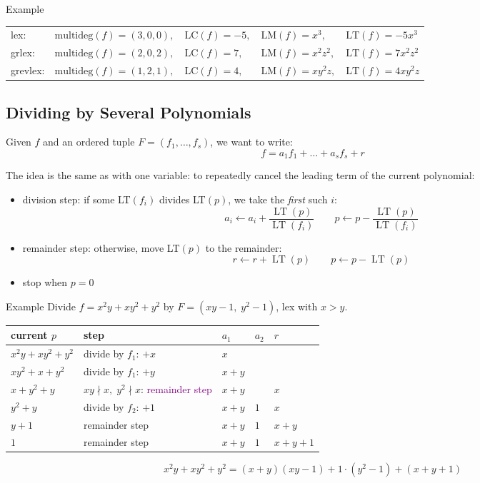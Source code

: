 \documentclass[a4paper, 11pt]{report}
\newcommand{\LT}{\operatorname{LT}}
\begin{document}
\begin{gframe}{Example}
\noindent
\begin{tabular}{@{}l@{\quad}l@{\quad}l@{\quad}l@{\quad}l@{}}
lex:     & $\mathrm{multideg}(f) = (3, 0, 0),$ & $\mathrm{LC}(f) = -5,$ & $\mathrm{LM}(f) = x^3,$    & $\mathrm{LT}(f) = -5x^3$ \\
grlex:   & $\mathrm{multideg}(f) = (2, 0, 2),$ & $\mathrm{LC}(f) = 7,$  & $\mathrm{LM}(f) = x^2z^2,$ & $\mathrm{LT}(f) = 7x^2z^2$ \\
grevlex: & $\mathrm{multideg}(f) = (1, 2, 1),$ & $\mathrm{LC}(f) = 4,$  & $\mathrm{LM}(f) = xy^2z,$  & $\mathrm{LT}(f) = 4xy^2z$ \\
\end{tabular}
\end{gframe}

\subsection{Dividing by Several Polynomials}
Given $f$ and an ordered tuple $F = (f_1, \dots, f_s)$, we want to write:
$$ f = a_1f_1 + \dots + a_{s}f_{s} + r $$

The idea is the same as with one variable: to repeatedly cancel the leading term of the current polynomial:
\begin{itemize}
    \item division step: if some LT$(f_{i})$ divides LT$(p)$, we take the \textit{first} such $i$:
        $$ a_{i} \leftarrow a_{i} + \frac{\LT(p)}{\LT(f_{i})} \quad \quad p \leftarrow p - \frac{\LT(p)}{\LT(f_{i})} $$
    \item remainder step: otherwise, move LT$(p)$ to the remainder:
        $$ r \leftarrow r + \LT(p) \quad \quad p \leftarrow p - \LT(p) $$
    \item stop when $p = 0$
\end{itemize}

\begin{gframe}{Example}
    Divide $f = x^2y + xy^2 + y^2$ by $F = (xy - 1,\; y^2 - 1)$, lex with $x > y$.

\begin{center}
\renewcommand{\arraystretch}{1.25}
\begin{tabular}{lllll}
\hline
current $p$ & step & $a_1$ & $a_2$ & $r$ \\
\hline
$x^2y + xy^2 + y^2$ & divide by $f_1$: $+x$ & $x$ & & \\
$xy^2 + x + y^2$ & divide by $f_1$: $+y$ & $x + y$ & & \\
$x + y^2 + y$ & $xy \nmid x,\; y^2 \nmid x$: \textcolor{purple}{remainder step} & $x + y$ & & $x$ \\
$y^2 + y$ & divide by $f_2$: $+1$ & $x + y$ & $1$ & $x$ \\
$y + 1$ & remainder step & $x + y$ & $1$ & $x + y$ \\
$1$ & remainder step & $x + y$ & $1$ & $x + y + 1$ \\
\hline
\end{tabular}
\end{center}
$$
x^2y + xy^2 + y^2 = (x + y)(xy - 1) + 1 \cdot (y^2 - 1) + (x + y + 1)
$$
\end{gframe}
\end{document}
